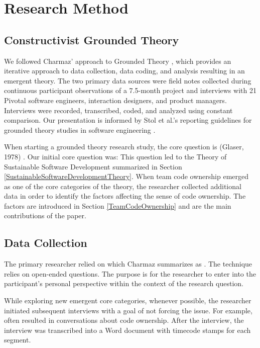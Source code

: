 \section{Research Method}
\label{ResearchMethod}

\subsection{Constructivist Grounded Theory}
We followed Charmaz' approach to Grounded Theory \cite{Charmaz}, which provides an iterative approach to data collection, data coding, and analysis resulting in an emergent theory. The two primary data sources were field notes collected during continuous participant observations of a 7.5-month project and interviews with 21 Pivotal software engineers, interaction designers, and product managers. Interviews were recorded, transcribed, coded, and analyzed using constant comparison. Our presentation is informed by Stol et al.'s reporting guidelines for grounded theory studies in software engineering \cite{StolGTinSE}. 

When starting a grounded theory research study, the core question is  (Glaser, 1978) \cite{GlaserTheoreticalSensitivity}. Our initial core question was:  This question led to the Theory of Sustainable Software Development summarized in Section \ref{SustainableSoftwareDevelopmentTheory}. When team code ownership emerged as one of the core categories of the theory, the researcher collected additional data in order to identify the factors affecting the sense of code ownership. The factors are introduced in Section \ref{TeamCodeOwnership} and are the main contributions of the paper.

\subsection{Data Collection}
The primary researcher relied on  which Charmaz summarizes as  \cite{Charmaz}. The technique relies on open-ended questions. The purpose is for the researcher to enter into the participant's personal perspective within the context of the research question. 

While exploring new emergent core categories, whenever possible, the researcher initiated subsequent interviews with a goal of not forcing the issue. For example,  often resulted in conversations about code ownership. After the interview, the interview was transcribed into a Word document with timecode stamps for each segment.


